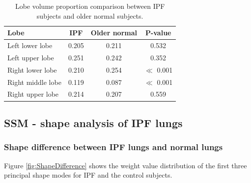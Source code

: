\begin{table}[htbp]
\centering
\caption{Lobe volume proportion comparison between IPF subjects and older normal subjects.}
\label{tab:LobeVolumeComparison}
\begin{tabular}{| l | c | c | c |}
\hline
\bf{Lobe} & \bf{IPF} & \bf{Older normal} & \bf{P-value}\\
\hline
Left lower lobe & 0.205 & 0.211 & 0.532\\
\hline
Left upper lobe	& 0.251 & 0.242 & 0.352\\
\hline
Right lower lobe	& 0.210 & 0.254 & $\ll$ 0.001\\
\hline
Right middle lobe	& 0.119 & 0.087 & $\ll$ 0.001\\
\hline
Right upper lobe	& 0.214 & 0.207 & 0.559\\
\hline
\end{tabular}
\end{table}

\subsection{SSM - shape analysis of IPF lungs}
\subsubsection{Shape difference between IPF lungs and normal lungs}
Figure \ref{fig:ShapeDifference} shows the weight value distribution of the first three principal shape modes for IPF and the control subjects. 

